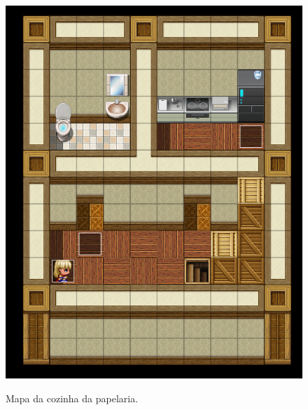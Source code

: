 \begin{figure}[!htbp]
	\centering
	\caption{Mapa da cozinha da papelaria.}
	\includegraphics[scale=0.5]{Textuais/Pictures/Cozinha_papelaria.png}
	\label{fig:cozinha-papelaria}
\end{figure}

